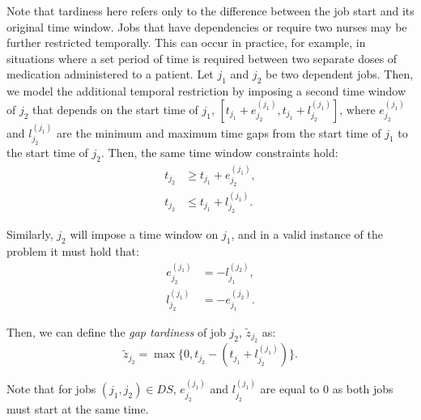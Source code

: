 \documentclass[a4paper,11pt,authoryear]{elsarticle}
\begin{document}
\noindent Note that tardiness here refers only to the difference between the job start and its original time window. Jobs that have dependencies or require two nurses may be further restricted temporally. This can occur in practice, for example, in situations where a set period of time is required between two separate doses of medication administered to a patient. Let $j_1$ and $j_2$ be two dependent jobs. Then, we model the additional temporal restriction by imposing a second time window of $j_2$ that depends on the start time of $j_1$, $[t_{j_1} + e_{j_2}^{(j_1)}, t_{j_1} + l_{j_2}^{(j_1)}]$, where $e_{j_2}^{(j_1)}$ and $l_{j_2}^{(j_1)}$ are the minimum and maximum time gaps from the start time of $j_1$ to the start time of $j_2$. Then, the same time window constraints hold:
\begin{subequations}
	\begin{align}
	t_{j_2} &\geq t_{j_1} + e^{(j_1)}_{j_2}, \label{eq:timewindow1}\\[3pt] %
	t_{j_2} &\leq t_{j_1} + l^{(j_1)}_{j_2}. \label{eq:timewindow2} %
	\end{align}
\end{subequations}

\noindent Similarly, $j_2$ will impose a time window on $j_1$, and in a valid instance of the problem it must hold that:
\begin{subequations}
	\begin{align}
		e^{(j_1)}_{j_2} &= -l^{(j_2)}_{j_1}, \label{eq:earliesttimedependecies}\\[3pt]
		l^{(j_1)}_{j_2} &= -e^{(j_2)}_{j_1}. \label{eq:latesttimedependencies}
	\end{align}
\end{subequations}

\noindent Then, we can define the \emph{gap tardiness} of job $j_2$, $\tilde{z}_{j_2}$ as:
\begin{equation}
    \tilde{z}_{j_2} = \max\{0, t_{j_2} - (t_{j_1} + l_{j_2}^{(j_1)})\}. \label{eq:gaptardiness}
\end{equation}

\noindent Note that for jobs $(j_1, j_2) \in DS$, $e_{j_2}^{(j_1)}$ and $l_{j_2}^{(j_1)}$ are equal to 0 as both jobs must start at the same time.
\end{document}
